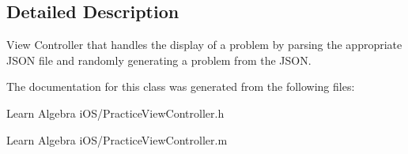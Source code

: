 \subsection{Detailed Description}
View Controller that handles the display of a problem by parsing the appropriate J\-S\-O\-N file and randomly generating a problem from the J\-S\-O\-N. 

The documentation for this class was generated from the following files\-:\begin{DoxyCompactItemize}
\item 
Learn Algebra i\-O\-S/Practice\-View\-Controller.\-h\item 
Learn Algebra i\-O\-S/Practice\-View\-Controller.\-m\end{DoxyCompactItemize}
